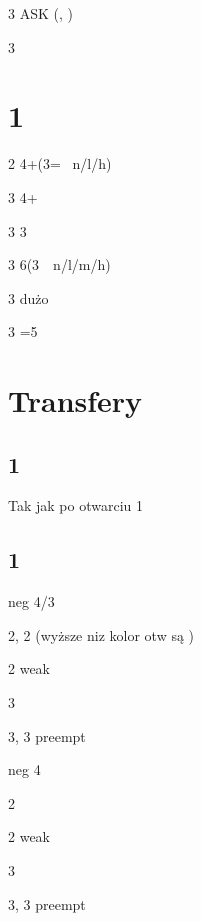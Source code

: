\documentclass[12pt, a4paper]{article}
\begin{document}
\begin{options}
  \item[3\clubs] ASK (\clubs, \diams)
  \item[3\hearts] \nf 
\end{options}


\vspace{3cm}
\section*{1\spades}
\begin{options}
  \item[2\nt] 4+\clubs (3\clubs = \lsf\ n/l/h)
  \item[3\clubs] 4+\diams
  \item[3\diams] 3\hearts \vimp 
  \item[3\hearts] 6\spades (3\hearts\ \lsf\ n/l/m/h)
  \item[3\spades] dużo \spades
  \item[3\nt] =5\hearts 
\end{options}
 


\section*{Transfery}


\subsection*{1\clubs}
Tak jak po otwarciu 1\nt

\subsection*{1\diams}
\compsequence{{1\diams}{2\clubs}}
\begin{compoptions}[3]
  \item[\dbl] neg 4/3
  \item[2\hearts, 2\spades] \fonce (wyższe niz kolor otw są \fonce)
  \item[2\nt] weak \clubs \orr \gf\ \clubs
  \item[3\clubs] \inv \diams 
  \item[3\diams, 3\major] preempt 
\end{compoptions}

\compsequence{{1\diams}{2\hearts}}
\begin{compoptions}[3]
  \item[\dbl] neg 4
  \item[2\spades] \fonce 
  \item[2\nt] weak \clubs \orr \gf\ \clubs
  \item[3\clubs] \inv \diams \orr {}\nt
  \item[3\diams, 3\spades] preempt 
\end{compoptions}
\end{document}
